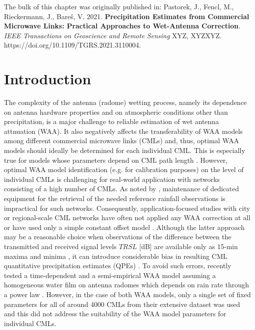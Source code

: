 \documentclass{ctuthesis}\usepackage[]{graphicx}\usepackage[]{color}
\begin{document}
{\footnotesize The bulk of this chapter was originally published in: \newline
\-\hspace{0.5cm}
Pastorek, J., Fencl, M., Rieckermann, J., Bareš, V. 2021. \textbf{Precipitation Estimates from Commercial Microwave Links: Practical Approaches to Wet-Antenna Correction}. \emph{IEEE Transactions on Geoscience and Remote Sensing} XYZ, XYZXYZ. \newline https://doi.org/10.1109/TGRS.2021.3110004.
}

\section{Introduction}

The complexity of the antenna (radome) wetting process, namely its dependence on antenna hardware properties \citep[e.g. coating;][]{lethMeasurementCampaignAssess2018} and on atmospheric conditions other than precipitation, is a major challenge to reliable estimation of wet antenna attnuation (WAA). It also negatively affects the transferability of WAA models among different commercial microwave links (CMLs) and, thus, optimal WAA models should ideally be determined for each individual CML. This is especially true for models whose parameters depend on CML path length \citep[e.g.][]{kharadlyEffectWetAntenna2001}. However, optimal WAA model identification (e.g. for calibration purposes) on the level of individual CMLs is challenging for real-world application with networks consisting of a high number of CMLs. As noted by \citep{ostrometzkyWetAntennaEffectFactor2018}, maintenance of dedicated equipment for the retrieval of the needed reference rainfall observations is impractical for such networks. Consequently, application-focused studies with city or regional-scale CML networks have often not applied any WAA correction at all \citep{chwalaPrecipitationObservationUsing2012, smiatekPotentialCommercialMicrowave2017} or have used only a simple constant offset model \citep{pastorekCommercialMicrowaveLinks2019, overeemMeasuringUrbanRainfall2011, roversiCommercialMicrowaveLinks2020, fenclAtmosphericObservationsEband2020}. Although the latter approach may be a reasonable choice when observations of the difference between the transmitted and received signal levels $TRSL$ [dB] are available only as 15-min maxima and minima  \citep{chwalaCommercialMicrowaveLink2019}, it can introduce considerable bias in resulting CML quantitative precipitation estimates (QPEs) \citep{pastorekCommercialMicrowaveLinks2019, fenclQuantifyingWetAntenna2019}. To avoid such errors, \cite{grafRainfallEstimationGermanwide2020} recently tested a time-dependent \citep{schleissQuantificationModelingWetAntenna2013} and a semi-empirical WAA model assuming a homogeneous water film on antenna radomes which depends on rain rate through a power law \citep{leijnseMicrowaveLinkRainfall2008}. However, in the case of both WAA models, only a single set of fixed parameters for all of around 4000 CMLs from their extensive dataset was used and this did not address the suitability of the WAA model parameters for individual CMLs.
\end{document}
